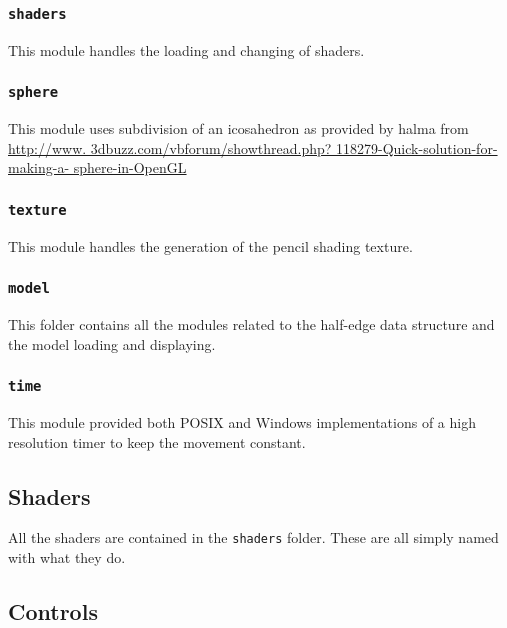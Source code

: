     \subsubsection{\texttt{shaders}}

      This module handles the loading and changing of shaders.

    \subsubsection{\texttt{sphere}}

      This module uses subdivision of an icosahedron as provided by halma from
      \href{http://www.3dbuzz.com/vbforum/showthread.php?118279-Quick-solution-for-making-a-sphere-in-OpenGL}
      {http://www.
      3dbuzz.com/vbforum/showthread.php?
      118279-Quick-solution-for-making-a-
      sphere-in-OpenGL}

    \subsubsection{\texttt{texture}}

      This module handles the generation of the pencil shading texture.

    \subsubsection{\texttt{model}}

      This folder contains all the modules related to the half-edge data
      structure and the model loading and displaying.

    \subsubsection{\texttt{time}}

      This module provided both POSIX and Windows implementations of a high
      resolution timer to keep the movement constant.

  \subsection{Shaders}
    
    All the shaders are contained in the \texttt{shaders} folder.  These are all
    simply named with what they do.

  \subsection{Controls}
    
